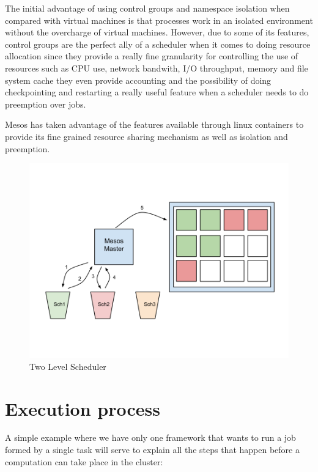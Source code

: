 \documentclass{report}                     %
\begin{document}
The initial advantage of using control groups and namespace isolation when
compared with virtual machines is that processes work in an isolated
environment without the overcharge of virtual machines. However, due
to some of its features, control groups are the perfect ally of a
scheduler when it comes to doing resource allocation since they provide
a really fine granularity for controlling the use of resources such
as CPU use, network bandwith, I/O throughput, memory and file system 
cache they even provide accounting and the possibility of doing
checkpointing and restarting a really useful feature when a scheduler
needs to do preemption over jobs.

Mesos has taken advantage of the features available through linux containers
\cite{_linux_????} to provide its fine grained resource sharing
mechanism as well as isolation and preemption.

\begin{figure}[!ht]
  \centering
  \includegraphics[scale=0.25,natwidth=960,natheight=720]{TwoLevel.png}
  \caption{Two Level Scheduler}
  \label{fig:two_level}
\end{figure}


\section{Execution process}

A simple example where we have only one framework that wants to run a 
job formed by a single task will serve to explain all the steps that happen
before a computation can take place in the cluster:
\end{document}
